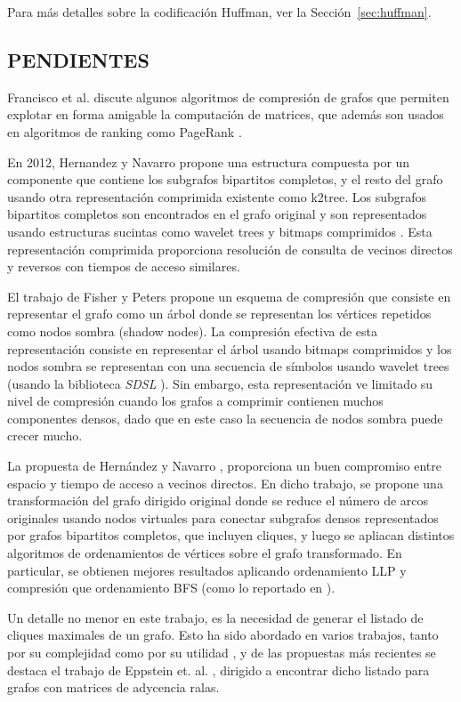 Para más detalles sobre la codificación Huffman, ver la Sección~\ref{sec:huffman}.

\subsection{PENDIENTES}


 Francisco et al. \cite{francisco2018exploiting} discute algunos algoritmos de compresión de grafos que permiten explotar en forma amigable la computación de matrices, que además son usados en algoritmos de ranking como PageRank \cite{page1999pagerank}.


En 2012, Hernandez y Navarro \cite{hernandez2012compressed} propone una estructura compuesta por un componente que contiene los subgrafos bipartitos completos, y el resto del grafo usando otra representación comprimida existente como k2tree. Los subgrafos bipartitos completos son encontrados en el grafo original y son representados usando estructuras sucintas como wavelet trees y bitmaps comprimidos \cite{gbmp2014sea}. Esta representación comprimida proporciona resolución de consulta de vecinos directos y reversos con tiempos de acceso similares.






El trabajo de Fisher y Peters \cite{FISCHER201639} propone un esquema de compresión que consiste en representar el grafo como un árbol donde se representan los vértices repetidos como nodos sombra (shadow nodes). La compresión efectiva de esta representación consiste en representar el árbol usando bitmaps comprimidos y los nodos sombra se representan con una secuencia de símbolos usando wavelet trees (usando la biblioteca \textit{SDSL} \cite{gbmp2014sea}). Sin embargo, esta representación ve limitado su nivel de compresión cuando los grafos a comprimir contienen muchos componentes densos, dado que en este caso la secuencia de nodos sombra puede crecer mucho.   

La propuesta de Hernández y Navarro \cite{tesisCecilia}, proporciona un buen compromiso entre espacio y tiempo de acceso a vecinos directos. En dicho trabajo, se propone una transformación del grafo dirigido original donde se reduce el número de arcos originales usando nodos virtuales para conectar subgrafos densos representados por grafos bipartitos completos, que incluyen cliques, y luego se apliacan distintos algoritmos de ordenamientos de vértices sobre el grafo transformado. En particular, se obtienen mejores resultados aplicando ordenamiento LLP y compresión \cite{boldi2011layered} que ordenamiento BFS (como lo reportado en \cite{Hernandez2014}).


Un detalle no menor en este trabajo, es la necesidad de generar el listado de cliques maximales de un grafo. Esto ha sido abordado en varios trabajos, tanto por su complejidad como por su utilidad \cite{eblen2012maximum, hendrix2010theoretical, bomze1999maximum}, y de las propuestas más recientes se destaca el trabajo de Eppstein et. al. \cite{listingcliques,  listingcliques2}, dirigido a encontrar dicho listado para grafos con matrices de adycencia ralas.


